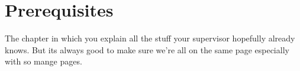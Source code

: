 \documentclass[thesis.tex]{subfiles}
\begin{document}
\chapter{Prerequisites}\label{chap:preq}
The chapter in which you explain all the stuff your supervisor hopefully already knows. But its always good to make sure we're all on the same page especially with so mange pages.

\subfilebib %
\end{document}
